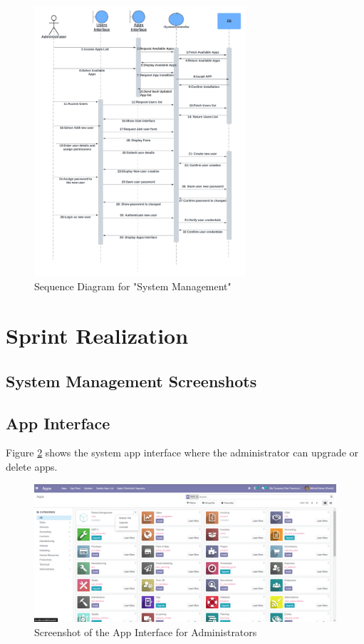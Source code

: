 \begin{figure}[h]
    \centering
    \includegraphics[width=0.7\textwidth]{sprint4/sprint4sequence.png} %
    \caption{Sequence Diagram for "System Management"}
    \label{fig:system_management_sequence_diagram}
\end{figure}
\section{Sprint Realization}

\subsection{System Management Screenshots}
\newpage
\subsection{App Interface}
Figure \ref{fig:app_interface} shows the system app interface where the administrator can upgrade or delete apps.

\begin{figure}[h]
    \centering
    \includegraphics[width=1\textwidth]{sprint4/managesystem1.png} %
    \caption{Screenshot of the App Interface for Administrators}
    \label{fig:app_interface}
\end{figure}

